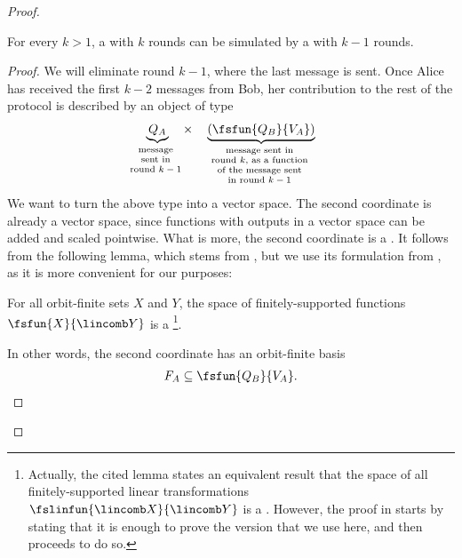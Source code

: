 \begin{proof}
    \begin{claim}\label{claim:reduce-round}
      For every $k > 1$, a  with $k$ rounds can be simulated by a 
       with $k-1$ rounds.
    \end{claim}
    \begin{proof}
        We will eliminate round $k-1$, where the last message is sent. 
        Once Alice has received the first $k-2$ messages from Bob, 
        her contribution to the rest of the protocol is described by an object of type 
          \begin{align}\label{eq:contribution-last-two-rounds}
            \myunderbrace{Q_A}{message \\ sent in \\ round $k-1$} \quad \times \quad  \myunderbrace{(\fsfun  {Q_B} {V_A})}{message sent in \\ round $k$, as a function \\ of the message sent \\ in  round $k-1$}
        \end{align}
        We want to turn the above type into a vector space. 
        The second coordinate is already a vector space, since functions with outputs in a vector space can be added and scaled pointwise. What is more, the  second coordinate is a . It follows from the following lemma, which stems from \cite{orbitFiniteVectorTheoretics}, 
        but we use its formulation from \cite{bojanczyk_slightly}, as it is more convenient for our purposes:
        \begin{lemma}
            \label{lem:function-space-of-ofd}
            For all orbit-finite sets $X$ and $Y$, the space of finitely-supported functions $\fsfun{X}{\lincomb Y}$ is a \footnote{
              Actually, the cited lemma states an equivalent result that the space of all 
              finitely-supported linear transformations $\fslinfun{\lincomb X}{\lincomb Y}$ is a . However, the proof in \cite{bojanczyk_slightly} starts by stating
              that it is enough to prove the version that we use here, and then proceeds to do so.
            }.
        \end{lemma}
        In other words, the second coordinate has an orbit-finite basis 
        \begin{align*}
        F_A \subseteq \fsfun  {Q_B} {V_A}.  
        \end{align*}

\end{proof}
\end{proof}
